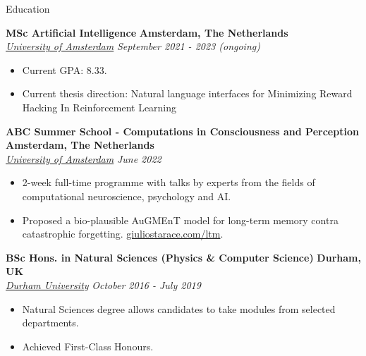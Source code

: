 \documentclass{resume} %
\begin{document}
\begin{rSection}{Education}

	{\bf MSc Artificial Intelligence} \hfill \textbf{Amsterdam, The Netherlands}
	\\\href{https://www.dur.ac.uk/}{\textit{University of Amsterdam}} \hfill {\em September 2021
		- 2023 (ongoing)}
	\begin{itemize}
		\item Current GPA: 8.33.
		\item Current thesis direction: Natural language interfaces for Minimizing Reward Hacking In
		      Reinforcement Learning
	\end{itemize}

	{\bf ABC Summer School - Computations in Consciousness and Perception} \hfill \textbf{Amsterdam, The Netherlands}
	\\\href{https://www.dur.ac.uk/}{\textit{University of Amsterdam}} \hfill {\em June 2022}
	\begin{itemize}
		\item 2-week full-time programme with talks by experts from the fields of computational
		      neuroscience, psychology and AI.
		\item Proposed a bio-plausible AuGMEnT model for long-term memory
		      contra catastrophic forgetting. \href{https://www.giuliostarace.com/ltm/}{giuliostarace.com/ltm}.
	\end{itemize}

	{\bf BSc Hons. in Natural Sciences (Physics \& Computer Science)} \hfill \textbf{Durham, UK}
	\\\href{https://www.dur.ac.uk/}{\textit{Durham University}} \hfill {\em October 2016 - July 2019}
	\begin{itemize}\vspace{-0.5em}
		\item Natural Sciences degree allows candidates to take modules from selected departments.
		\item Achieved First-Class Honours.
	\end{itemize}
\end{rSection}
\end{document}
